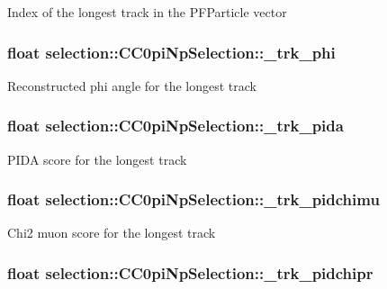 Index of the longest track in the P\-F\-Particle vector \hypertarget{classselection_1_1CC0piNpSelection_a85a6029e249e3ff20ea6d8eaabf22142}{
\subsubsection[{\-\_\-trk\-\_\-phi}]{\setlength{\rightskip}{0pt plus 5cm}float selection\-::\-C\-C0pi\-Np\-Selection\-::\-\_\-trk\-\_\-phi\hspace{0.3cm}{\ttfamily [private]}}}\label{classselection_1_1CC0piNpSelection_a85a6029e249e3ff20ea6d8eaabf22142}
Reconstructed phi angle for the longest track \hypertarget{classselection_1_1CC0piNpSelection_af0fe49227e33b3f46015a821de58ba1f}{
\subsubsection[{\-\_\-trk\-\_\-pida}]{\setlength{\rightskip}{0pt plus 5cm}float selection\-::\-C\-C0pi\-Np\-Selection\-::\-\_\-trk\-\_\-pida\hspace{0.3cm}{\ttfamily [private]}}}\label{classselection_1_1CC0piNpSelection_af0fe49227e33b3f46015a821de58ba1f}
P\-I\-D\-A score for the longest track \hypertarget{classselection_1_1CC0piNpSelection_a74ddf5622f3ee32110e9342361020a89}{
\subsubsection[{\-\_\-trk\-\_\-pidchimu}]{\setlength{\rightskip}{0pt plus 5cm}float selection\-::\-C\-C0pi\-Np\-Selection\-::\-\_\-trk\-\_\-pidchimu\hspace{0.3cm}{\ttfamily [private]}}}\label{classselection_1_1CC0piNpSelection_a74ddf5622f3ee32110e9342361020a89}
Chi2 muon score for the longest track \hypertarget{classselection_1_1CC0piNpSelection_a712eaf6dc6086f1be5705a3bbe5226fc}{
\subsubsection[{\-\_\-trk\-\_\-pidchipr}]{\setlength{\rightskip}{0pt plus 5cm}float selection\-::\-C\-C0pi\-Np\-Selection\-::\-\_\-trk\-\_\-pidchipr\hspace{0.3cm}{\ttfamily [private]}}}\label{classselection_1_1CC0piNpSelection_a712eaf6dc6086f1be5705a3bbe5226fc}
